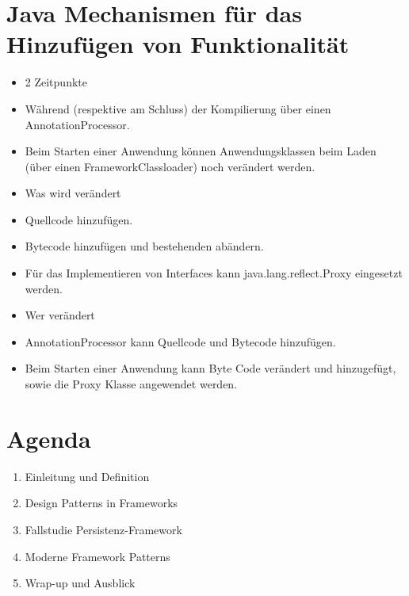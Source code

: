 \documentclass[10pt]{article}
\begin{document}
\section*{Java Mechanismen für das Hinzufügen von Funktionalität}
\begin{itemize}
  \item 2 Zeitpunkte
  \item Während (respektive am Schluss) der Kompilierung über einen AnnotationProcessor.
  \item Beim Starten einer Anwendung können Anwendungsklassen beim Laden (über einen FrameworkClassloader) noch verändert werden.
  \item Was wird verändert
  \item Quellcode hinzufügen.
  \item Bytecode hinzufügen und bestehenden abändern.
  \item Für das Implementieren von Interfaces kann java.lang.reflect.Proxy eingesetzt werden.
  \item Wer verändert
  \item AnnotationProcessor kann Quellcode und Bytecode hinzufügen.
  \item Beim Starten einer Anwendung kann Byte Code verändert und hinzugefügt, sowie die Proxy Klasse angewendet werden.
\end{itemize}

\section*{Agenda}
\begin{enumerate}
  \item Einleitung und Definition
  \item Design Patterns in Frameworks
  \item Fallstudie Persistenz-Framework
  \item Moderne Framework Patterns
  \item Wrap-up und Ausblick
\end{enumerate}
\end{document}
